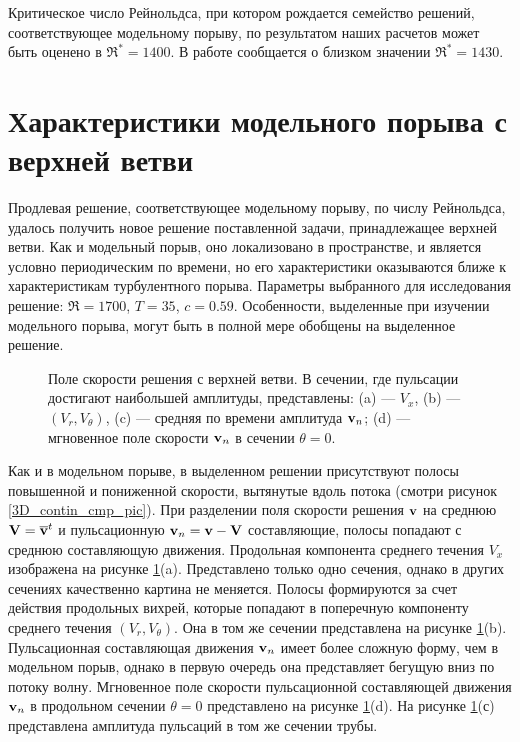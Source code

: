 Критическое число Рейнольдса, при котором рождается семейство решений, соответствующее модельному порыву, по результатом наших расчетов может быть оценено в $\Re^* = 1400$. В работе \cite{Avila2013} сообщается о близком значении $\Re^* = 1430$. 


\section{Характеристики модельного порыва с верхней ветви}

Продлевая решение, соответствующее модельному порыву, по числу Рейнольдса, удалось получить новое решение поставленной задачи, принадлежащее верхней ветви. Как и модельный порыв, оно локализовано в пространстве, и является условно периодическим по времени, но его характеристики оказываются ближе к характеристикам турбулентного порыва. Параметры выбранного для исследования решение: $\Re = 1700$, $T = 35$, $c = 0.59$. Особенности, выделенные при изучении модельного порыва, могут быть в полной мере обобщены на выделенное решение. 


\begin{figure}
\caption{Поле скорости решения с верхней ветви. В сечении, где пульсации достигают наибольшей амплитуды, представлены: (a) --- $V_{x}$, (b) --- $(V_{r}, V_{\theta})$, (c) --- средняя по времени амплитуда $\mathbf{v}_n$; (d) --- мгновенное поле скорости $\mathbf{v}_n$ в сечении $\theta = 0$. }
\label{local_ub_means_pic}
\end{figure}


Как и в модельном порыве, в выделенном решении присутствуют полосы повышенной и пониженной скорости, вытянутые вдоль потока (смотри рисунок \ref{3D_contin_cmp_pic}). При разделении поля скорости решения $\mathbf{v}$ на среднюю $\mathbf{V} = \overline{\mathbf{v}}^t$ и пульсационную $\mathbf{v}_n = \mathbf{v} - \mathbf{V}$ составляющие, полосы попадают с среднюю составляющую движения. Продольная компонента среднего течения $V_x$ изображена на рисунке \ref{local_ub_means_pic}(a). Представлено только одно сечения, однако в других сечениях качественно картина не меняется. Полосы формируются за счет действия продольных вихрей, которые попадают в поперечную компоненту среднего течения $(V_r, V_\theta)$. Она в том же сечении представлена на рисунке \ref{local_ub_means_pic}(b). Пульсационная составляющая движения $\mathbf{v}_n$ имеет более сложную форму, чем в модельном порыв, однако в первую очередь она представляет бегущую вниз по потоку волну. Мгновенное поле скорости пульсационной составляющей движения $\mathbf{v}_n$ в продольном сечении $\theta = 0$ представлено на рисунке \ref{local_ub_means_pic}(d). На рисунке \ref{local_ub_means_pic}(с) представлена амплитуда пульсаций в том же сечении трубы. 

